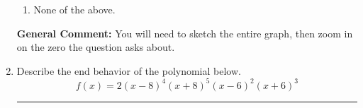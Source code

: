 \documentclass{extbook}[14pt]
\newcommand{\litem}[1]{\item #1

\rule{\textwidth}{0.4pt}}
\begin{document}
\begin{enumerate}
{\begin{enumerate}[label=\Alph*.]
\item None of the above.\end{enumerate}
\textbf{General Comment:} You will need to sketch the entire graph, then zoom in on the zero the question asks about.
}
\litem{
Describe the end behavior of the polynomial below.
\[ f(x) = 2(x - 8)^{4}(x + 8)^{5}(x - 6)^{2}(x + 6)^{3} \]

}
\end{enumerate}
\end{document}
